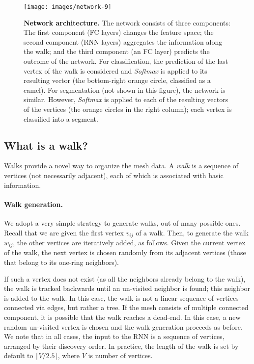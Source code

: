 \documentclass[acmtog]{acmart}
\begin{document}
\begin{figure*}[ht]
\centering 
\texttt{[image: images/network-9]} 
\caption{{\bf Network architecture.} 
The network consists of three components: 
The first component (FC layers) changes the feature space; the second component (RNN layers) aggregates the information along the walk; and the third component (an FC layer) predicts the outcome of the network. 
For classification, the prediction of the last vertex of the walk is considered and {\em Softmax} is applied to its resulting vector (the bottom-right orange circle, classified as a camel).
For segmentation (not shown in this figure), the network is similar.
However, {\em Softmax} is applied to each of the resulting vectors of the vertices (the orange circles in the right column); each vertex is classified into a segment.
}
 \label{fig:NetworkArch}
\end{figure*}

\subsection{What is a walk?}
Walks provide a novel way to organize the mesh data.
A {\em walk} is a sequence of vertices (not necessarily adjacent), each of which is associated with basic information.

\paragraph{Walk generation.}
We adopt a very simple strategy to generate walks, out of many possible ones.
Recall that we are given the first vertex $v_{ij}$ of a walk.
Then, to generate the walk $w_{ij}$, the other vertices are iteratively added, as follows.
Given the current vertex of the walk, the next vertex is chosen randomly from its adjacent vertices (those that belong to its one-ring neighbors).

If such a vertex does not exist (as all the neighbors already belong to the walk),  the walk is tracked backwards until an un-visited neighbor is found; this neighbor is added to the walk. 
In this case, the walk is not a linear sequence of vertices connected via edges, but rather a tree.
If the mesh consists of multiple connected component, it is possible that the walk reaches a dead-end.
In this case, a new random  un-visited vertex is chosen and the walk generation proceeds as before.
We note that in all cases, the input to the RNN is a sequence of vertices, arranged by their discovery order.
In practice,  the length of the walk is set by default to $\lceil V/2.5 \rceil$, where $V$ is number of vertices. 
\end{document}

